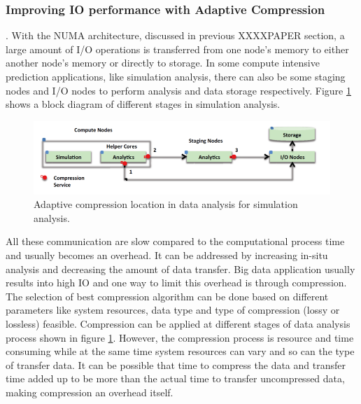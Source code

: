 \documentclass[runningheads,a4paper]{llncs}
\begin{document}
{\subsubsection{Improving IO performance with Adaptive Compression}.
With the NUMA architecture, discussed in previous XXXXPAPER section, a large amount of I/O operations is transferred from one node's memory to either another node's memory or directly to storage. In some compute intensive prediction applications, like simulation analysis, there can also be some staging nodes and I/O nodes to perform analysis and data storage respectively. Figure \ref{fig:krunal7}  shows a block diagram of different stages in simulation analysis. 
\begin{figure}[!htb]
	\includegraphics[scale=0.7]{./images/krunal7}
	\centering
	\caption{Adaptive compression location in data analysis for simulation analysis.}
	\label{fig:krunal7}
	\end{figure}
All these communication are slow compared to the computational process time and usually becomes an overhead. It can be addressed by increasing in-situ analysis and decreasing the amount of data transfer. Big data application usually results into high IO and one way to limit this overhead is through compression. The selection of best compression algorithm can be done based on different parameters like system resources, data type and type of compression (lossy or lossless) feasible. Compression can be applied at different stages of data analysis process shown in figure \ref{fig:krunal7}. However, the compression process is resource and time consuming while at the same time system resources can vary and so can the type of transfer data. It can be possible that time to compress the data and transfer time added up to be more than the actual time to transfer uncompressed data, making compression an overhead itself.\\

}
\end{document}
